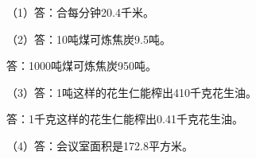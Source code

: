 
\begingroup\color{answerred}\par\endgroup
{}
\begingroup\color{answerred}\noindent（1）答：合每分钟20.4千米。\par
\noindent（2）答：10吨煤可炼焦炭9.5吨。\par\hspace*{2em}答：1000吨煤可炼焦炭950吨。\par
\noindent（3）答：1吨这样的花生仁能榨出410千克花生油。\par\hspace*{2em}答：1千克这样的花生仁能榨出0.41千克花生油。\par
\noindent（4）答：会议室面积是172.8平方米。\par\par\endgroup
